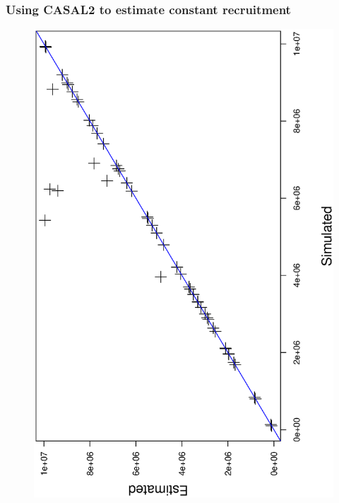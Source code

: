 \documentclass{beamer}
\begin{document}
\begin{frame}
\frametitle{Using CASAL2 to estimate constant recruitment}

\begin{figure}
  \includegraphics[scale=0.38, angle=-90]{../../TestCASAL2_withSimulatedData/StockDescriptionInNumbers/EstimateSingleConstantRecruitment/ByPassingInitialAbundancesToCASAL2/Results/Graphics/SimVsEst.ps}
  \end{figure}

\end{frame}

\end{document}
